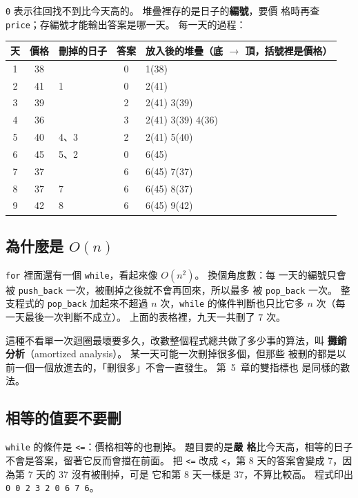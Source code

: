 \texttt{0} 表示往回找不到比今天高的。 堆疊裡存的是日子的\textbf{編號}，要價
格時再查 \texttt{price}；存編號才能輸出答案是哪一天。 每一天的過程：

\begin{center}
\begin{tabular}{cclcl}
\toprule
天 & 價格 & 刪掉的日子 & 答案 & 放入後的堆疊（底 $\to$ 頂，括號裡是價格） \\
\midrule
1 & 38 & & 0 & 1(38) \\
2 & 41 & 1 & 0 & 2(41) \\
3 & 39 & & 2 & 2(41) 3(39) \\
4 & 36 & & 3 & 2(41) 3(39) 4(36) \\
5 & 40 & 4、3 & 2 & 2(41) 5(40) \\
6 & 45 & 5、2 & 0 & 6(45) \\
7 & 37 & & 6 & 6(45) 7(37) \\
8 & 37 & 7 & 6 & 6(45) 8(37) \\
9 & 42 & 8 & 6 & 6(45) 9(42) \\
\bottomrule
\end{tabular}
\end{center}

\subsection{為什麼是 $O(n)$}

\texttt{for} 裡面還有一個 \texttt{while}，看起來像 $O(n^2)$。 換個角度數：每
一天的編號只會被 \texttt{push\_back} 一次，被刪掉之後就不會再回來，所以最多
被 \texttt{pop\_back} 一次。 整支程式的 \texttt{pop\_back} 加起來不超過 $n$
次，\texttt{while} 的條件判斷也只比它多 $n$ 次（每一天最後一次判斷不成立）。
上面的表格裡，九天一共刪了 $7$ 次。

這種不看單一次迴圈最壞要多久，改數整個程式總共做了多少事的算法，叫
\textbf{攤銷分析}（amortized analysis）。 某一天可能一次刪掉很多個，但那些
被刪的都是以前一個一個放進去的，「刪很多」不會一直發生。 第~5~章的雙指標也
是同樣的數法。

\subsection{相等的值要不要刪}

\texttt{while} 的條件是 \texttt{<=}：價格相等的也刪掉。 題目要的是\textbf{嚴
格}比今天高，相等的日子不會是答案，留著它反而會擋在前面。 把 \texttt{<=} 改成
\texttt{<}，第 $8$ 天的答案會變成 $7$，因為第 $7$ 天的 $37$ 沒有被刪掉，可是
它和第 $8$ 天一樣是 $37$，不算比較高。 程式印出
\texttt{0 0 2 3 2 0 6 7 6}。

